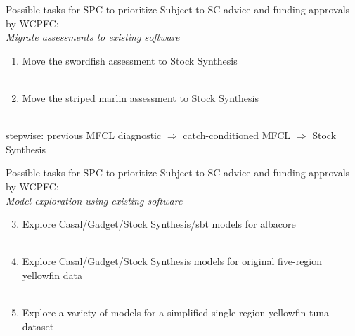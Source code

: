 \documentclass[aspectratio=169,fleqn]{beamer}
\begin{document}
\begin{frame}{Possible tasks for SPC to prioritize}
  Subject to SC advice and funding approvals by WCPFC:\\[4ex]
  {\orange\it Migrate assessments to existing software}\\[2ex]
  \begin{enumerate}
    \item Move the {\darkgreen swordfish} assessment to Stock Synthesis\\
    \\[3ex]
    \item Move the {\darkgreen striped marlin} assessment to Stock Synthesis\\
    \\[3ex]
  \end{enumerate}
  \gray stepwise: previous MFCL diagnostic $\Rightarrow$ catch-conditioned
  MFCL $\Rightarrow$ Stock Synthesis
\end{frame}


\begin{frame}{Possible tasks for SPC to prioritize}
  Subject to SC advice and funding approvals by WCPFC:\\[3.5ex]
  {\orange\it Model exploration using existing software}\\[2ex]
  \begin{enumerate}\setcounter{enumi}{2}
    \item Explore Casal/Gadget/Stock Synthesis/sbt models for {\darkgreen
      albacore}\\
    \\[3ex]
    \item Explore Casal/Gadget/Stock Synthesis models for original {\darkgreen
      five-region yellowfin} data\\
    \\[3ex]
    \item Explore a variety of models for a simplified {\darkgreen single-region
      yellowfin} tuna dataset\\
    \\[3ex]
  \end{enumerate}
\end{frame}
\end{document}

